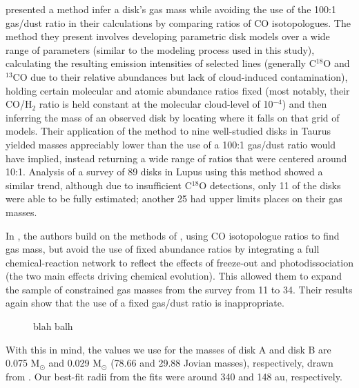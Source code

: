 \citet{Williams2014} presented a method infer a disk's gas mass while avoiding the use of the 100:1 gas/dust ratio in their calculations by comparing ratios of CO isotopologues. The method they present involves developing parametric disk models over a wide range of parameters (similar to the modeling process used in this study), calculating the resulting emission intensities of selected lines (generally C$^{18}$O and $^{13}$CO due to their relative abundances but lack of cloud-induced contamination), holding certain molecular and atomic abundance ratios fixed (most notably, their CO/H$_2$ ratio is held constant at the molecular cloud-level of 10$^{-4}$) and then inferring the mass of an observed disk by locating where it falls on that grid of models. Their application of the method to nine well-studied disks in Taurus yielded masses appreciably lower than the use of a 100:1 gas/dust ratio would have implied, instead returning a wide range of ratios that were centered around 10:1. Analysis of a survey of 89 disks in Lupus \citep{Ansdell2016} using this method showed a similar trend, although due to insufficient C$^{18}$O detections, only 11 of the disks were able to be fully estimated; another 25 had upper limits places on their gas masses.

In \citet{Miotello2014,Miotello2016}, the authors build on the methods of \citet{Williams2014}, using CO isotopologue ratios to find gas mass, but avoid the use of fixed abundance ratios by integrating a full chemical-reaction network to reflect the effects of freeze-out and photodissociation (the two main effects driving chemical evolution). This allowed them to expand the sample of constrained gas masses from the \citet{Ansdell2016} survey from 11 to 34. Their results again show that the use of a fixed gas/dust ratio is inappropriate.



\begin{figure}[h]
  \hspace*{\fill}%
  \hspace*{\fill}%
  \caption{blah balh}
  \label{fig:GDRs}
\end{figure}


With this in mind, the values we use for the masses of disk A and disk B are 0.075 M$_\odot$ and 0.029 M$_\odot$ (78.66 and 29.88 Jovian masses), respectively, drawn from \citet{Williams2014}. Our best-fit radii from the \hco fits were around 340 and 148 au, respectively.



